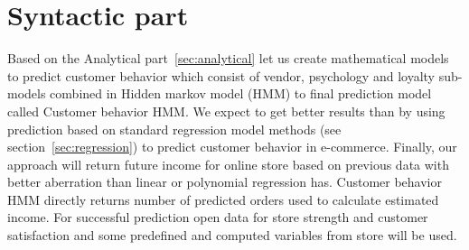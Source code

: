 
\chapter{Syntactic part} \label{sec:methodology}
Based on the Analytical part~\ref{sec:analytical} let us create  mathematical models to predict customer behavior which consist of
vendor, psychology and loyalty sub-models combined in Hidden markov model (HMM) to final prediction model called Customer behavior HMM.
We expect to get better results than by using prediction based on standard regression model methods (see section~\ref{sec:regression}) to predict customer behavior in e-commerce.
Finally, our approach will return future income for online store based on previous data with better aberration than linear or polynomial regression has.
Customer behavior HMM directly returns number of predicted orders used to calculate estimated income.
For successful prediction open data for store strength and customer satisfaction and some predefined and computed variables from store will be used.

